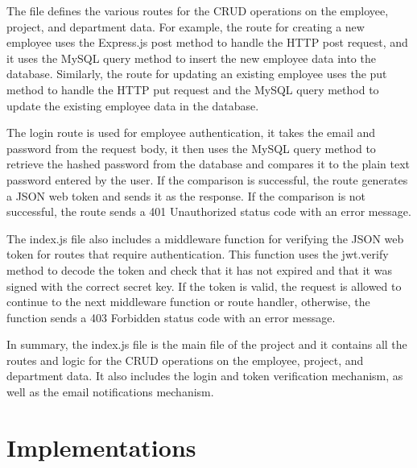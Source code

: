 \documentclass[12pt]{article}
\begin{document}
	The file defines the various routes for the CRUD operations on the employee, project, and department data. For example, the route for creating a new employee uses the Express.js post method to handle the HTTP post request, and it uses the MySQL query method to insert the new employee data into the database. Similarly, the route for updating an existing employee uses the put method to handle the HTTP put request and the MySQL query method to update the existing employee data in the database.
	
	The login route is used for employee authentication, it takes the email and password from the request body, it then uses the MySQL query method to retrieve the hashed password from the database and compares it to the plain text password entered by the user. If the comparison is successful, the route generates a JSON web token and sends it as the response. If the comparison is not successful, the route sends a 401 Unauthorized status code with an error message.
	
	The index.js file also includes a middleware function for verifying the JSON web token for routes that require authentication. This function uses the jwt.verify method to decode the token and check that it has not expired and that it was signed with the correct secret key. If the token is valid, the request is allowed to continue to the next middleware function or route handler, otherwise, the function sends a 403 Forbidden status code with an error message.
	
	In summary, the index.js file is the main file of the project and it contains all the routes and logic for the CRUD operations on the employee, project, and department data. It also includes the login and token verification mechanism, as well as the email notifications mechanism.
	
	\section*{Implementations}
\end{document}
